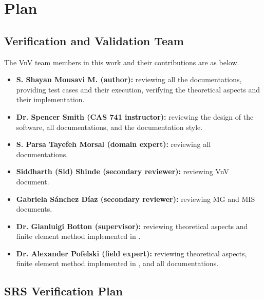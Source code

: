 \documentclass[12pt, titlepage]{article}
\begin{document}
\section{Plan}
	
\subsection{Verification and Validation Team}

The VnV team members in this work and their contributions are as below.

\begin{itemize}
	\item \textbf{S. Shayan Mousavi M. (author):} reviewing all the documentations, providing test cases and their execution, verifying the theoretical aspects and their implementation.
	
	\item \textbf{Dr. Spencer Smith (CAS 741 instructor):} reviewing the design of the software, all documentations, and the documentation style.
	
	\item \textbf{S. Parsa Tayefeh Morsal (domain expert):} reviewing all documentations. 
	
	\item \textbf{Siddharth (Sid) Shinde (secondary reviewer):} reviewing VnV document.
	
	\item \textbf{ Gabriela Sánchez Díaz (secondary reviewer):} reviewing MG and MIS documents.
	
	\item \textbf{Dr. Gianluigi Botton (supervisor):} reviewing theoretical aspects and finite element method implemented in \progname{}.
	
	\item \textbf{Dr. Alexander Pofelski (field expert):} reviewing theoretical aspects, finite element method implemented in \progname{}, and all documentations. 	
\end{itemize}


\subsection{SRS Verification Plan}
\end{document}
